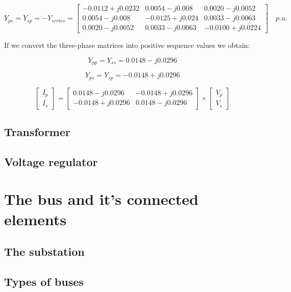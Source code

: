 \documentclass{tufte-book}
\begin{document}
$$
Y_{ps} = Y_{sp} = -Y_{series} = \left[ \begin{array}{ccc}
-0.0112+j0.0232  & 0.0054-j0.008   & 0.0020-j0.0052 \\  0.0054-j0.008  &  -0.0125+j0.024 & 0.0033-j0.0063 \\  0.0020-j0.0052 &  0.0033-j0.0063 & -0.0100+j0.0224
\end{array} \right]\quad  p.u.
$$

If we convert the three-phase matrices into positive sequence values we obtain:

$$
Y_{pp} = Y_{ss} = 0.0148 -j0.0296
$$

$$
Y_{ps} = Y_{sp} = -0.0148 +j0.0296
$$


$$
\left[\begin{array}{c}
I_p \\
I_s
\end{array}\right] = \left[\begin{array}{cc}
0.0148 -j0.0296 & -0.0148 +j0.0296\\
-0.0148 +j0.0296 & 0.0148 -j0.0296
\end{array}\right] \times \left[\begin{array}{c}
V_p \\
V_s
\end{array}\right]
$$

\section{Transformer}



\section{Voltage regulator}


\chapter{The bus and it's connected elements}


\section{The substation}



\section{Types of buses}
\end{document}
